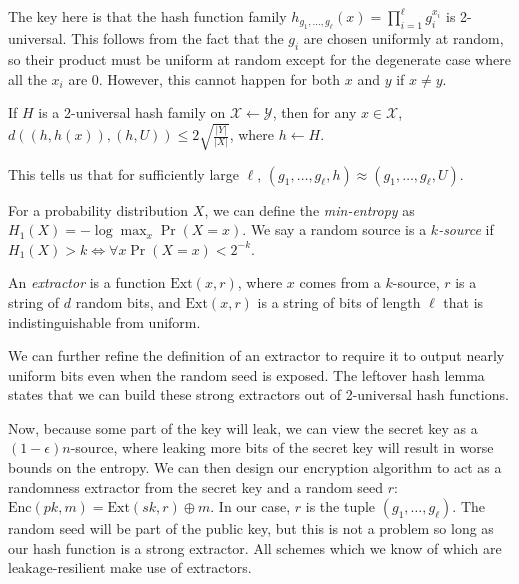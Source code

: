 \documentclass[10pt]{article}
\begin{document}
The key here is that the hash function family $h_{g_1,\dots,g_\ell}(x) = \prod_{i=1}^\ell g_i ^ {x_i}$ is 2-universal. This follows from the fact that the $g_i$ are chosen uniformly at random, so their product must be uniform at random except for the degenerate case where all the $x_i$ are $0$. However, this cannot happen for both $x$ and $y$ if $x \neq y$.

\begin{lemma}
If $H$ is a 2-universal hash family on $\mathcal{X} \leftarrow \mathcal{Y}$, then for any $x \in \mathcal{X}$, $d((h,h(x)), (h,U)) \le 2\sqrt{\frac{|Y|}{|X|}}$, where $h \leftarrow H$.
\end{lemma}

This tells us that for sufficiently large $\ell$, $(g_1,\dots,g_\ell,h) \approx (g_1,\dots,g_\ell,U)$.

\begin{definition}
For a probability distribution $X$, we can define the \emph{min-entropy} as $H_1(X) = -\log \max_x \Pr(X = x)$. We say a random source is a \emph{$k$-source} if $H_1(X) > k \iff \forall x \Pr(X = x) < 2^{-k}$.
\end{definition}

\begin{definition}
An \emph{extractor} is a function $\mathrm{Ext}(x,r)$, where $x$ comes from a $k$-source, $r$ is a string of $d$ random bits, and $\mathrm{Ext}(x,r)$ is a string of bits of length $\ell$ that is indistinguishable from uniform.
\end{definition}

We can further refine the definition of an extractor to require it to output nearly uniform bits even when the random seed is exposed. The leftover hash lemma states that we can build these strong extractors out of 2-universal hash functions.

Now, because some part of the key will leak, we can view the secret key as a $(1-\epsilon)n$-source, where leaking more bits of the secret key will result in worse bounds on the entropy. We can then design our encryption algorithm to act as a randomness extractor from the secret key and a random seed $r$: $\mathrm{Enc}(pk,m) = \mathrm{Ext}(sk,r) \oplus m$. In our case, $r$ is the tuple $(g_1,\dots,g_\ell)$. The random seed will be part of the public key, but this is not a problem so long as our hash
function is a strong extractor. All schemes which we know of which are leakage-resilient make
use of extractors.
\end{document}
